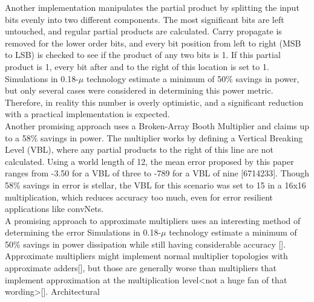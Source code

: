 \documentclass[journal]{IEEEtran}
\begin{document}
	\indent Another implementation manipulates the partial product by splitting the input bits evenly into two different components. The most significant bits are left untouched, and regular partial products are calculated. Carry propagate is removed for the lower order bits, and every bit position from left to right (MSB to LSB) is checked to see if the product of any two bits is 1. If this partial product is 1, every bit after and to the right of this location is set to 1. Simulations in 0.18-$\mu$ technology estimate a minimum of 50\% savings in power, but only several cases were considered in determining this power metric. Therefore, in reality this number is overly optimistic, and a significant reduction with a practical implementation is expected. \\
	
	\indent Another promising approach uses a Broken-Array Booth Multiplier and claims up to a 58\% savings in power. The multiplier works by defining a Vertical Breaking Level (VBL), where any partial products to the right of this line are not calculated. Using a world length of 12, the mean error proposed by this paper ranges from -3.50 for a VBL of three to -789 for a VBL of nine [6714233]. Though 58\% savings in error is stellar, the VBL for this scenario was set to 15 in a 16x16 multiplication, which reduces accuracy too much, even for error resilient applications like convNets. \\ 

	\indent A promising approach to approximate multipliers uses an interesting method of determining the error Simulations in 0.18-$\mu$ technology estimate a minimum of 50\% savings in power dissipation while still having considerable accuracy [].\\
	\indent Approximate multipliers might implement normal multiplier topologies with approximate adders[], but those are generally worse than multipliers that implement approximation at the multiplication level<not a huge fan of that wording>[]. Architectural \\
\end{document}

